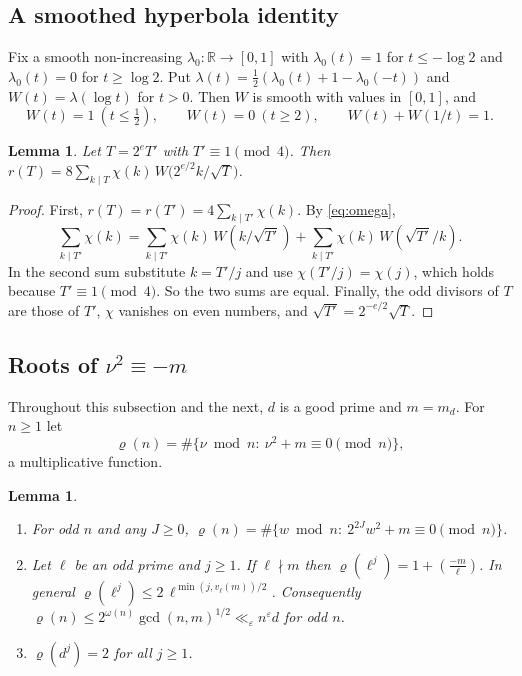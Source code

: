 \documentclass[11pt]{amsart}
\newtheorem{lemma}[theorem]{Lemma}
\theoremstyle{remark}
\theoremstyle{definition}
\numberwithin{equation}{section}
\newcommand{\R}{\mathbb{R}}
\newcommand{\eps}{\varepsilon}
\newcommand{\leg}[2]{\left(\frac{#1}{#2}\right)}
\begin{document}
\subsection{A smoothed hyperbola identity}
Fix a smooth non-increasing $\lambda_0:\R\to[0,1]$ with $\lambda_0(t)=1$ for $t\le-\log2$ and $\lambda_0(t)=0$ for $t\ge\log 2$. Put $\lambda(t)=\frac12(\lambda_0(t)+1-\lambda_0(-t))$ and $W(t)=\lambda(\log t)$ for $t>0$. Then $W$ is smooth with values in $[0,1]$, and
\begin{equation}\label{eq:omega}
W(t)=1\ (t\le\tfrac12),\qquad W(t)=0\ (t\ge2),\qquad W(t)+W(1/t)=1 .
\end{equation}

\begin{lemma}\label{lem:hyperbola}
Let $T=2^eT'$ with $T'\equiv1\pmod 4$. Then $r(T)=8\sum_{k\mid T}\chi(k)\,W\bigl(2^{e/2}k/\sqrt T\bigr)$.
\end{lemma}

\begin{proof}
First, $r(T)=r(T')=4\sum_{k\mid T'}\chi(k)$. By \eqref{eq:omega},
\[
\sum_{k\mid T'}\chi(k)=\sum_{k\mid T'}\chi(k)\,W(k/\sqrt{T'})+\sum_{k\mid T'}\chi(k)\,W(\sqrt{T'}/k).
\]
In the second sum substitute $k=T'/j$ and use $\chi(T'/j)=\chi(j)$, which holds because $T'\equiv1\pmod 4$. So the two sums are equal. Finally, the odd divisors of $T$ are those of $T'$, $\chi$ vanishes on even numbers, and $\sqrt{T'}=2^{-e/2}\sqrt T$.
\end{proof}

\subsection{\texorpdfstring{Roots of $\nu^2\equiv-m$}{Square roots of -m}}
Throughout this subsection and the next, $d$ is a good prime and $m=m_d$. For $n\ge1$ let
\[
\varrho(n)=\#\{\nu\bmod n:\ \nu^2+m\equiv0\pmod n\},
\]
a multiplicative function.

\begin{lemma}\label{lem:rho}
\begin{enumerate}
\item[(a)] For odd $n$ and any $J\ge0$, $\varrho(n)=\#\{w\bmod n:\ 2^{2J}w^2+m\equiv0\pmod n\}$.
\item[(b)] Let $\ell$ be an odd prime and $j\ge1$. If $\ell\nmid m$ then $\varrho(\ell^j)=1+\leg{-m}{\ell}$. In general $\varrho(\ell^j)\le2\,\ell^{\min(j,v_\ell(m))/2}$. Consequently $\varrho(n)\le 2^{\omega(n)}\gcd(n,m)^{1/2}\ll_\eps n^{\eps}d$ for odd $n$.
\item[(c)] $\varrho(d^j)=2$ for all $j\ge1$.
\end{enumerate}
\end{lemma}
\end{document}
